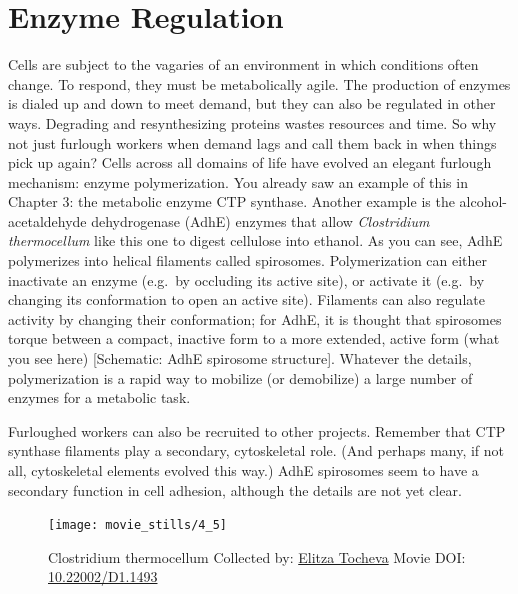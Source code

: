 \documentclass[]{tufte-book}
\begin{document}
\section{Enzyme Regulation}\label{enzyme-regulation}

Cells are subject to the vagaries of an environment in which conditions
often change. To respond, they must be metabolically agile. The
production of enzymes is dialed up and down to meet demand, but they can
also be regulated in other ways. Degrading and resynthesizing proteins
wastes resources and time. So why not just furlough workers when demand
lags and call them back in when things pick up again? Cells across all
domains of life have evolved an elegant furlough mechanism: enzyme
polymerization. You already saw an example of this in Chapter 3: the
metabolic enzyme CTP synthase. Another example is the
alcohol-acetaldehyde dehydrogenase (AdhE) enzymes that allow
\emph{Clostridium thermocellum} like this one to digest cellulose into
ethanol. As you can see, AdhE polymerizes into helical filaments called
spirosomes. Polymerization can either inactivate an enzyme (e.g.~by
occluding its active site), or activate it (e.g.~by changing its
conformation to open an active site). Filaments can also regulate
activity by changing their conformation; for AdhE, it is thought that
spirosomes torque between a compact, inactive form to a more extended,
active form (what you see here) {[}Schematic: AdhE spirosome
structure{]}. Whatever the details, polymerization is a rapid way to
mobilize (or demobilize) a large number of enzymes for a metabolic task.

Furloughed workers can also be recruited to other projects. Remember
that CTP synthase filaments play a secondary, cytoskeletal role. (And
perhaps many, if not all, cytoskeletal elements evolved this way.) AdhE
spirosomes seem to have a secondary function in cell adhesion, although
the details are not yet clear.





\begin{figure}
\texttt{[image: movie\_stills/4\_5]} \caption[Clostridium thermocellum Collected by:
\protect\hyperlink{elitza_tocheva}{Elitza Tocheva} Movie DOI:
\href{https://doi.org/10.22002/D1.1493}{10.22002/D1.1493}]{Clostridium thermocellum Collected by:
\protect\hyperlink{elitza_tocheva}{Elitza Tocheva} Movie DOI:
\href{https://doi.org/10.22002/D1.1493}{10.22002/D1.1493}}\label{fig:4-5}
\end{figure}
\end{document}
